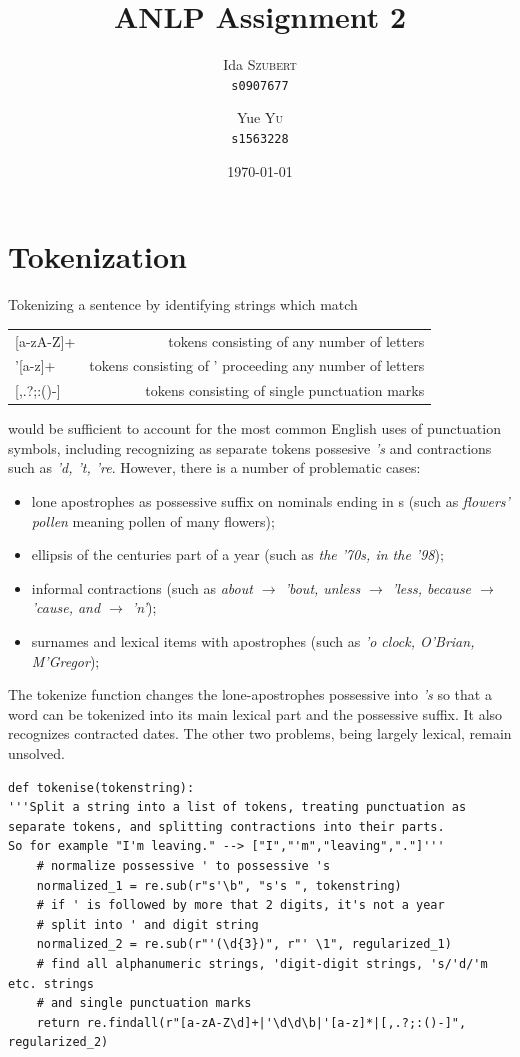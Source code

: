 \documentclass{article}
\title{ANLP Assignment 2} %
\author{
	Ida \textsc{Szubert}\\
	\texttt{s0907677}
	\and
	Yue \textsc{Yu}\\
	\texttt{s1563228}
}
\date{\today} %
\begin{document}
\section{Tokenization}

Tokenizing a sentence by identifying strings which match

\begin{center}
\begin{tabular}{l r}
	{[}a-zA-Z{]}+&tokens consisting of any number of letters\\
	'[a-z]+&tokens consisting of ' proceeding any number of letters\\
	{[},.?;:()-{]}&tokens consisting of single punctuation marks\\
\end{tabular}
\end{center}
would be sufficient to account for the most common English uses of punctuation symbols, including recognizing as separate tokens possesive \emph{'s} and contractions such as \emph{'d, 't, 're}.  However, there is a number of problematic cases:

\begin{itemize}
	\item
	lone apostrophes as possessive suffix on nominals ending in s (such as \emph{flowers' pollen} meaning pollen of many flowers);
	\item
	ellipsis of the centuries part of a year (such as \emph{the '70s, in the '98});
	\item
	informal contractions (such as \emph{about $\rightarrow$ 'bout, unless $\rightarrow$  ’less, because $\rightarrow$  'cause, and $\rightarrow$ 'n'});
	\item
	surnames and lexical items with apostrophes (such as \emph{'o clock, O'Brian, M'Gregor});
\end{itemize}
The tokenize function changes the lone-apostrophes possessive into \emph{'s} so that a word can be tokenized into its main lexical part and the possessive suffix. It also recognizes contracted dates. The other two problems, being largely lexical, remain unsolved.

\begin{lstlisting}
def tokenise(tokenstring):
'''Split a string into a list of tokens, treating punctuation as
separate tokens, and splitting contractions into their parts.
So for example "I'm leaving." --> ["I","'m","leaving","."]'''
	# normalize possessive ' to possessive 's
	normalized_1 = re.sub(r"s'\b", "s's ", tokenstring)
	# if ' is followed by more that 2 digits, it's not a year
	# split into ' and digit string
	normalized_2 = re.sub(r"'(\d{3})", r"' \1", regularized_1)
	# find all alphanumeric strings, 'digit-digit strings, 's/'d/'m etc. strings
	# and single punctuation marks
	return re.findall(r"[a-zA-Z\d]+|'\d\d\b|'[a-z]*|[,.?;:()-]", regularized_2)
\end{lstlisting}
\end{document}
